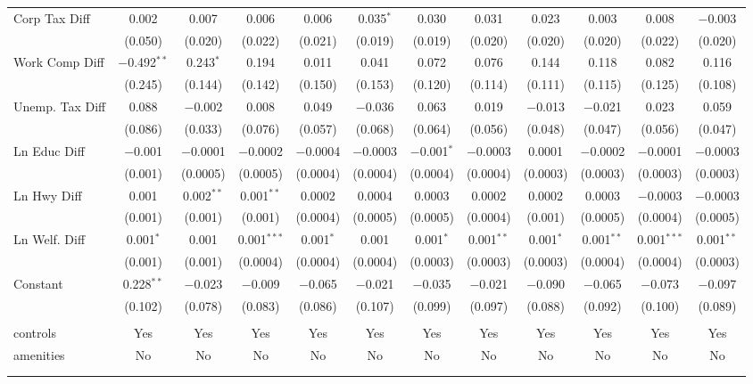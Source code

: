 \begin{table}[!htbp]
\begin{tabular}{@{\extracolsep{5pt}}lccccccccccc}
  Corp Tax Diff & 0.002 & 0.007 & 0.006 & 0.006 & 0.035$^{*}$ & 0.030 & 0.031 & 0.023 & 0.003 & 0.008 & $-$0.003 \\ 
  & (0.050) & (0.020) & (0.022) & (0.021) & (0.019) & (0.019) & (0.020) & (0.020) & (0.020) & (0.022) & (0.020) \\ 
  Work Comp Diff & $-$0.492$^{**}$ & 0.243$^{*}$ & 0.194 & 0.011 & 0.041 & 0.072 & 0.076 & 0.144 & 0.118 & 0.082 & 0.116 \\ 
  & (0.245) & (0.144) & (0.142) & (0.150) & (0.153) & (0.120) & (0.114) & (0.111) & (0.115) & (0.125) & (0.108) \\ 
  Unemp. Tax Diff & 0.088 & $-$0.002 & 0.008 & 0.049 & $-$0.036 & 0.063 & 0.019 & $-$0.013 & $-$0.021 & 0.023 & 0.059 \\ 
  & (0.086) & (0.033) & (0.076) & (0.057) & (0.068) & (0.064) & (0.056) & (0.048) & (0.047) & (0.056) & (0.047) \\ 
  Ln Educ Diff & $-$0.001 & $-$0.0001 & $-$0.0002 & $-$0.0004 & $-$0.0003 & $-$0.001$^{*}$ & $-$0.0003 & 0.0001 & $-$0.0002 & $-$0.0001 & $-$0.0003 \\ 
  & (0.001) & (0.0005) & (0.0005) & (0.0004) & (0.0004) & (0.0004) & (0.0004) & (0.0003) & (0.0003) & (0.0003) & (0.0003) \\ 
  Ln Hwy Diff & 0.001 & 0.002$^{**}$ & 0.001$^{**}$ & 0.0002 & 0.0004 & 0.0003 & 0.0002 & 0.0002 & 0.0003 & $-$0.0003 & $-$0.0003 \\ 
  & (0.001) & (0.001) & (0.001) & (0.0004) & (0.0005) & (0.0005) & (0.0004) & (0.001) & (0.0005) & (0.0004) & (0.0005) \\ 
  Ln Welf. Diff & 0.001$^{*}$ & 0.001 & 0.001$^{***}$ & 0.001$^{*}$ & 0.001 & 0.001$^{*}$ & 0.001$^{**}$ & 0.001$^{*}$ & 0.001$^{**}$ & 0.001$^{***}$ & 0.001$^{**}$ \\ 
  & (0.001) & (0.001) & (0.0004) & (0.0004) & (0.0004) & (0.0003) & (0.0003) & (0.0003) & (0.0004) & (0.0004) & (0.0003) \\ 
  Constant & 0.228$^{**}$ & $-$0.023 & $-$0.009 & $-$0.065 & $-$0.021 & $-$0.035 & $-$0.021 & $-$0.090 & $-$0.065 & $-$0.073 & $-$0.097 \\ 
  & (0.102) & (0.078) & (0.083) & (0.086) & (0.107) & (0.099) & (0.097) & (0.088) & (0.092) & (0.100) & (0.089) \\ 
 \hline \\[-1.8ex] 
controls & Yes & Yes & Yes & Yes & Yes & Yes & Yes & Yes & Yes & Yes & Yes \\ 
amenities & No & No & No & No & No & No & No & No & No & No & No \\ 
\hline \\[-1.8ex] 
\hline 
\hline \\[-1.8ex] 
\end{tabular} 
\end{table} 
